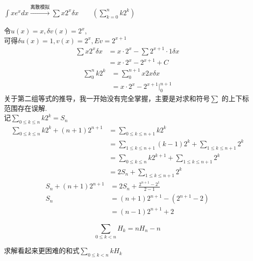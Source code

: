 \begin{example}
    $ \int x e^x dx \xrightarrow[]{\text{离散模拟}} \sum x 2^x \delta x \qquad(\sum_{k=0}^{n}k2^k) $ 
\end{example}
\begin{solve}
    令$ u(x)=x, \delta v(x)=2^x $,\\
    可得$ \delta u(x)=1, v(x)=2^x,Ev = 2^{x+1} $  
    \begin{align*}
        \sum x2^x\delta x
        &= x\cdot 2^x - \sum 2^{x+1}\cdot 1\delta x\\
        &= x\cdot 2^x - 2^{x+1}+C
    \end{align*}
    \begin{align*}
        \sum_{0}^{n} k2^k
        &= \sum_{0}^{n+1}x2x\delta x\\
        &= x\cdot 2^x-2^{x+1}\Big|_0^{n+1}
    \end{align*}
    关于第二组等式的推导，我一开始没有完全掌握，主要是对求和符号$ \sum $ 的上下标范围存在误解.\\
    记$ \sum_{0\leqslant k\leqslant n} k 2^k = S_n $ 
    \begin{align*}
        \sum_{0\leqslant k\leqslant n} k 2^k + (n+1)2^{n+1}
        &= \sum_{0\leqslant k\leqslant n+1} k 2^k \\
        &= \sum_{1\leqslant k\leqslant n+1} (k-1) 2^k + \sum_{1\leqslant k\leqslant n+1} 2^k \\
        &= \sum_{0\leqslant k\leqslant n} k 2^{k+1} + \sum_{1\leqslant k\leqslant n+1} 2^k \\
        &= 2S_n + \sum_{1\leqslant k\leqslant n+1} 2^k 
    \end{align*}
    \begin{align*}
        S_n + (n+1)2^{n+1}
        &= 2S_n + \frac{2^{n+1}-2^1}{2-1}\\
        S_n &= (n+1)2^{n+1} - (2^{n+1}-2)\\
        &=(n-1)2^{n+1}+2
    \end{align*}
\end{solve}

\begin{equation}
    \sum_{0\leqslant k< n} H_k =nH_n-n
\end{equation}

求解看起来更困难的和式$ \sum_{0\leqslant k< n} k H_k $ 

